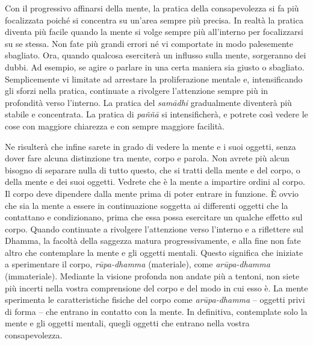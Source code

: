 Con il progressivo affinarsi della mente, la pratica della
consapevolezza si fa più focalizzata poiché si concentra su un'area
sempre più precisa. In realtà la pratica diventa più facile quando la
mente si volge sempre più all'interno per focalizzarsi su se stessa. Non
fate più grandi errori né vi comportate in modo palesemente sbagliato.
Ora, quando qualcosa eserciterà un influsso sulla mente, sorgeranno dei
dubbi. Ad esempio, se agire o parlare in una certa maniera sia giusto o
sbagliato. Semplicemente vi limitate ad arrestare la proliferazione
mentale e, intensificando gli sforzi nella pratica, continuate a
rivolgere l'attenzione sempre più in profondità verso l'interno. La
pratica del \emph{samādhi} gradualmente diventerà più stabile e
concentrata. La pratica di \emph{paññā} si intensificherà, e potrete
così vedere le cose con maggiore chiarezza e con sempre maggiore
facilità.

Ne risulterà che infine sarete in grado di vedere la mente e i suoi
oggetti, senza dover fare alcuna distinzione tra mente, corpo e parola.
Non avrete più alcun bisogno di separare nulla di tutto questo, che si
tratti della mente e del corpo, o della mente e dei suoi oggetti.
Vedrete che è la mente a impartire ordini al corpo. Il corpo deve
dipendere dalla mente prima di poter entrare in funzione. È ovvio che
sia la mente a essere in continuazione soggetta ai differenti oggetti
che la contattano e condizionano, prima che essa possa esercitare un
qualche effetto sul corpo. Quando continuate a rivolgere l'attenzione
verso l'interno e a riflettere sul Dhamma, la facoltà della saggezza
matura progressivamente, e alla fine non fate altro che contemplare la
mente e gli oggetti mentali. Questo significa che iniziate a
sperimentare il corpo, \emph{rūpa-dhamma} (materiale), come
\emph{arūpa-dhamma} (immateriale). Mediante la visione profonda non
andate più a tentoni, non siete più incerti nella vostra comprensione
del corpo e del modo in cui esso è. La mente sperimenta le
caratteristiche fisiche del corpo come \emph{arūpa-dhamma} -- oggetti
privi di forma -- che entrano in contatto con la mente. In definitiva,
contemplate solo la mente e gli oggetti mentali, quegli oggetti che
entrano nella vostra consapevolezza.

